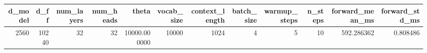\begin{tabular}{rrrrrrrrrrrr}
\toprule
d_model & d_ff & num_layers & num_heads & theta & vocab_size & context_length & batch_size & warmup_steps & n_steps & forward_mean_ms & forward_std_ms \\
\midrule
2560 & 10240 & 32 & 32 & 10000.000000 & 10000 & 1024 & 4 & 5 & 10 & 592.286362 & 0.808486 \\
\bottomrule
\end{tabular}
